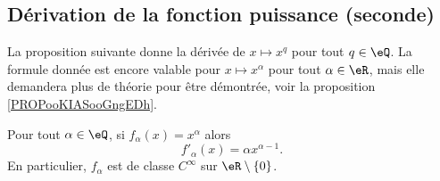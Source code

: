 \subsection{Dérivation de la fonction puissance (seconde)}

La proposition suivante donne la dérivée de \( x\mapsto x^q\) pour tout \( q\in \eQ\). La formule donnée est encore valable pour \( x\mapsto x^{\alpha}\) pour tout \( \alpha\in \eR\), mais elle demandera plus de théorie pour être démontrée, voir la proposition \ref{PROPooKIASooGngEDh}.
\begin{proposition}     \label{PROPooSGLGooIgzque}
	Pour tout \( \alpha\in \eQ\), si \( f_{\alpha}(x)=x^{\alpha}\) alors
	\begin{equation}
		f'_{\alpha}(x)=\alpha x^{\alpha-1}.
	\end{equation}
	En particulier, \( f_{\alpha}\) est de classe \(  C^{\infty}\) sur \( \eR\setminus\{ 0 \}\).
\end{proposition}


